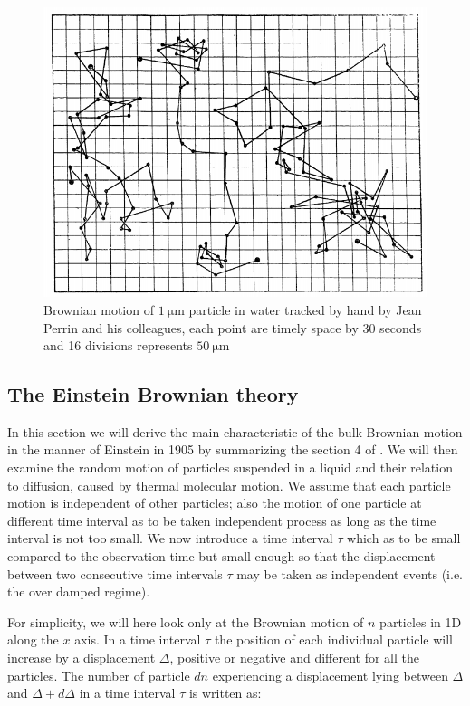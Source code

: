 \begin{figure}[h]
	\centering
	\includegraphics[scale=0.6]{02_body/chapter1/image/graph_perrin.png}
	\caption{Brownian motion of $1 ~ \mathrm{\mu m}$ particle in water tracked by hand by Jean Perrin and his colleagues, each point are timely space by 30 seconds and 16 divisions represents $50 ~ \mathrm{\mu m}$}
	\label{fig:Perrin_Brownian}
\end{figure}

\subsection{The Einstein Brownian theory}

In this section we will derive the main characteristic of the bulk Brownian motion in the manner of Einstein in 1905 by summarizing the section 4 of \cite{einstein_uber_1905}. We will then examine  the random motion of particles suspended in a liquid and their relation to diffusion, caused by thermal molecular motion. We assume that each particle motion is independent of other particles; also the motion of one particle at different time interval as to be taken independent process as long as the time interval is not too small. We now introduce a time interval $\tau$ which as to be small compared to the observation time but small enough so that  the displacement between two consecutive time intervals $\tau$ may be taken as independent events (i.e. the over damped regime). 

For simplicity, we will here look only at the Brownian motion of $n$ particles in 1D along the $x$ axis. In a time interval $\tau$ the position of each individual particle will increase by a displacement $\Delta$, positive or negative and different for all the particles. The number of particle $dn$ experiencing a displacement lying between $\Delta$ and $\Delta + d\Delta$ in a time interval $\tau$ is written as:

